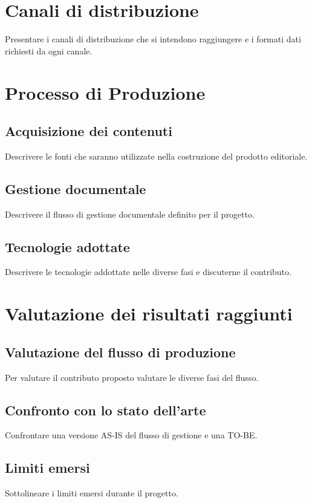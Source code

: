 \documentclass[a4paper,12pt]{article}
\begin{document}
\section*{Canali di distribuzione}
Presentare i canali di distribuzione che si intendono raggiungere e i formati dati richiesti da ogni canale. 

\section*{Processo di Produzione}
\subsection*{Acquisizione dei contenuti}
Descrivere le fonti che saranno utilizzate nella costruzione del prodotto editoriale.

\subsection*{Gestione documentale}
Descrivere il flusso di gestione documentale definito per il progetto.

\subsection*{Tecnologie adottate}
Descrivere le tecnologie addottate nelle diverse fasi e discuterne il contributo.

\section*{Valutazione dei risultati raggiunti}
\subsection*{Valutazione del flusso di produzione}
Per valutare il contributo proposto valutare le diverse fasi del flusso.

\subsection*{Confronto con lo stato dell’arte}
Confrontare una versione AS-IS del flusso di gestione e una TO-BE.

\subsection*{Limiti emersi}
Sottolineare i limiti emersi durante il progetto.
\end{document}
